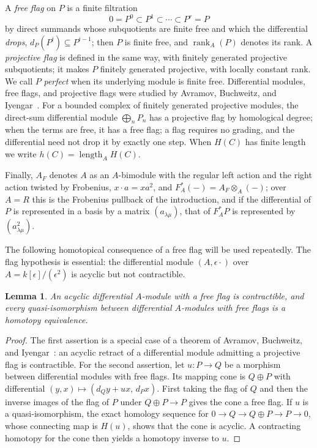 \documentclass[11pt,reqno]{amsart}
\theoremstyle{plain}
\newtheorem{lemma}[theorem]{Lemma}
\theoremstyle{definition}
\DeclareMathOperator{\length}{length}
\DeclareMathOperator{\rank}{rank}
\newcommand{\htot}{h}
\begin{document}
A \emph{free flag} on $P$ is a finite filtration
\[
0=P^{0}\subset P^{1}\subset\cdots\subset P^{r}=P
\]
by direct summands whose subquotients are finite free and which the differential \emph{drops},
$d_P(P^{i})\subseteq P^{i-1}$; then $P$ is finite free, and $\rank_A(P)$ denotes its rank.  A
\emph{projective flag} is defined in the same way, with finitely generated projective subquotients;
it makes $P$ finitely generated projective, with locally constant rank.  We call
$P$ \emph{perfect} when its underlying module is finite free.  Differential modules, free flags, and
projective flags were studied by Avramov, Buchweitz, and Iyengar~\cite{ABI}.  For a bounded complex
of finitely generated projective modules, the direct-sum differential module $\bigoplus_nP_n$ has a
projective flag by homological degree; when the terms are free, it has a free flag;
a flag requires no grading, and the differential need not drop it by exactly one step.  When $H(C)$ has finite
length we write $\htot(C)=\length_AH(C)$.

Finally, $A_F$ denotes $A$ as an $A$-bimodule with the regular left action
and the right action twisted by Frobenius, $x\cdot a=xa^{2}$, and $F_A^{*}(-)=A_F\otimes_A(-)$; over $A=R$
this is the Frobenius pullback of the introduction, and if the differential of $P$ is represented in a
basis by a matrix $(a_{\lambda\mu})$, that of $F_A^{*}P$ is represented by $(a_{\lambda\mu}^2)$.

The following homotopical consequence of a free flag will be used repeatedly.  The flag hypothesis
is essential: the differential module $(A,\epsilon\cdot)$ over
$A=k[\epsilon]/(\epsilon^2)$ is acyclic but not contractible.

\begin{lemma}\label{lem:contract}
An acyclic differential $A$-module with a free flag is contractible, and every
quasi-isomorphism between differential $A$-modules with free flags is a homotopy
equivalence.
\end{lemma}

\begin{proof}
The first assertion is a special case of a theorem of Avramov, Buchweitz, and
Iyengar~\cite[Theorem~2.3]{ABI}: an acyclic retract of a differential module admitting a projective
flag is contractible.  For the second assertion, let $u\colon P\to Q$ be a morphism between
differential modules with free flags.  Its mapping cone is $Q\oplus P$ with differential
$(y,x)\mapsto(d_Qy+ux,\,d_Px)$.  First taking the flag of $Q$ and then the inverse images of the
flag of $P$ under $Q\oplus P\to P$ gives the cone a free flag.  If $u$ is a quasi-isomorphism, the
exact homology sequence for $0\to Q\to Q\oplus P\to P\to0$, whose connecting map is $H(u)$, shows
that the cone is acyclic.  A contracting homotopy for the cone then yields a homotopy inverse to
$u$.
\end{proof}
\end{document}
